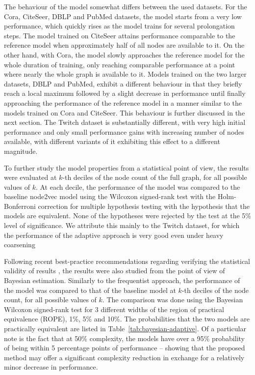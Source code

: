 The behaviour of the model somewhat differs between the used datasets. For the Cora, CiteSeer, DBLP and PubMed datasets, the model starts from a very low performance, which quickly rises as the model trains for several prolongation steps. The model trained on CiteSeer attains performance comparable to the reference model when approximately half of all nodes are available to it. On the other hand, with Cora, the model slowly approaches the reference model for the whole duration of training, only reaching comparable performance at a point where nearly the whole graph is available to it. Models trained on the two larger datasets, DBLP and PubMed, exhibit a different behaviour in that they briefly reach a local maximum followed by a slight decrease in performance until finally approaching the performance of the reference model in a manner similar to the models trained on Cora and CiteSeer. This behaviour is further discussed in the next section. The Twitch dataset is substantially different, with very high initial performance and only small performance gains with increasing number of nodes available, with different variants of it exhibiting this effect to a different magnitude.

To further study the model properties from a statistical point of view, the results were evaluated at \( k \)-th deciles of the node count of the full graph, for all possible values of \( k \). At each decile, the performance of the model was compared to the baseline node2vec model using the Wilcoxon signed-rank test with the Holm-Bonferroni correction for multiple hypothesis testing with the hypothesis that the models are equivalent. None of the hypotheses were rejected by the test at the 5\% level of significance. We attribute this mainly to the Twitch dataset, for which the performance of the adaptive approach is very good even under heavy coarsening

Following recent best-practice recommendations regarding verifying the statistical validity of results \cite{benavoli_time_2017}, the results were also studied from the point of view of Bayesian estimation. Similarly to the frequentist approach, the performance of the model was compared to that of the baseline model at \( k \)-th deciles of the node count, for all possible values of \( k \). The comparison was done using the Bayesian Wilcoxon signed-rank test \cite{benavoli_bayesian_2014} for 3 different widths of the region of practical equivalence (ROPE), 1\%, 5\% and 10\%. The probabilities that the two models are practically equivalent are listed in Table~\ref{tab:bayesian-adaptive}. Of a particular note is the fact that at 50\% complexity, the models have over a 95\% probability of being within 5 percentage points of performance -- showing that the proposed method may offer a significant complexity reduction in exchange for a relatively minor decrease in performance.

